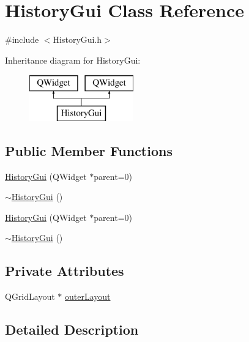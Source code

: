 \hypertarget{class_history_gui}{\section{History\-Gui Class Reference}
\label{class_history_gui}
}


{\ttfamily \#include $<$History\-Gui.\-h$>$}

Inheritance diagram for History\-Gui\-:\begin{figure}[H]
\begin{center}
\leavevmode
\includegraphics[height=2.000000cm]{class_history_gui}
\end{center}
\end{figure}
\subsection*{Public Member Functions}
\begin{DoxyCompactItemize}
\item 
\hyperlink{class_history_gui_a6284a83241498a4d7f590a5ff90f02ec}{History\-Gui} (Q\-Widget $\ast$parent=0)
\item 
\hyperlink{class_history_gui_a7cad89c5b8e44107acbf59cf97f2a094}{$\sim$\-History\-Gui} ()
\item 
\hyperlink{class_history_gui_a6284a83241498a4d7f590a5ff90f02ec}{History\-Gui} (Q\-Widget $\ast$parent=0)
\item 
\hyperlink{class_history_gui_a7cad89c5b8e44107acbf59cf97f2a094}{$\sim$\-History\-Gui} ()
\end{DoxyCompactItemize}
\subsection*{Private Attributes}
\begin{DoxyCompactItemize}
\item 
Q\-Grid\-Layout $\ast$ \hyperlink{class_history_gui_a2042361a7084b011a017b31ea37ee655}{outer\-Layout}
\end{DoxyCompactItemize}


\subsection{Detailed Description}


